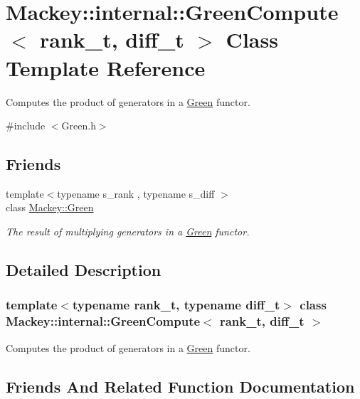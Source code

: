 \hypertarget{classMackey_1_1internal_1_1GreenCompute}{}\section{Mackey\+:\+:internal\+:\+:Green\+Compute$<$ rank\+\_\+t, diff\+\_\+t $>$ Class Template Reference}
\label{classMackey_1_1internal_1_1GreenCompute}


Computes the product of generators in a \hyperlink{classMackey_1_1Green}{Green} functor.  




{\ttfamily \#include $<$Green.\+h$>$}

\subsection*{Friends}
\begin{DoxyCompactItemize}
\item 
{\footnotesize template$<$typename s\+\_\+rank , typename s\+\_\+diff $>$ }\\class \hyperlink{classMackey_1_1internal_1_1GreenCompute_a1ab71a61751d67ece5b0504aaf9560f1}{Mackey\+::\+Green}
\begin{DoxyCompactList}\small\item\em The result of multiplying generators in a \hyperlink{classMackey_1_1Green}{Green} functor. \end{DoxyCompactList}\end{DoxyCompactItemize}


\subsection{Detailed Description}
\subsubsection*{template$<$typename rank\+\_\+t, typename diff\+\_\+t$>$\newline
class Mackey\+::internal\+::\+Green\+Compute$<$ rank\+\_\+t, diff\+\_\+t $>$}

Computes the product of generators in a \hyperlink{classMackey_1_1Green}{Green} functor. 

\subsection{Friends And Related Function Documentation}
\mbox{\label{classMackey_1_1internal_1_1GreenCompute_a1ab71a61751d67ece5b0504aaf9560f1}} 
